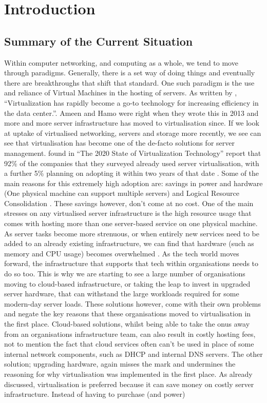 
\chapter{Introduction}
\section{Summary of the Current Situation}
\label{CurrentSituation}
Within computer networking, and computing as a whole, we tend to move through paradigms. Generally, there is a set way of doing things and eventually there are breakthroughs that shift that standard. One such paradigm is the use and reliance of Virtual Machines in the hosting of servers. As written by \citet{VirtualNetworkingInTheFuture}, ``Virtualization has rapidly become a go-to technology for increasing efficiency in the data center.''. Ameen and Hamo were right when they wrote this in 2013 and more and more server infrastructure has moved to virtualisation since. If we look at uptake of virtualised networking, servers and storage more recently, we see can see that virtualisation has become one of the de-facto solutions for server management. \citet{Spiceworks} found in ``The 2020 State of Virtualization Technology'' report that 92\% of the companies that they surveyed already used server virtualisation, with a further 5\%  planning on adopting it within two years of that date \citep{Spiceworks}. Some of the main reasons for this extremely high adoption are: savings in power and hardware (One physical machine can support multiple servers) and Logical Resource Consolidation \citep{LetsGetVirtual}. These savings however, don't come at no cost. One of the main stresses on any virtualised server infrastructure is the high resource usage that comes with hosting more than one server-based service on one physical machine. As server tasks become more strenuous, or when entirely new services need to be added to an already existing infrastructure, we can find that hardware (such as memory and CPU usage) becomes overwhelmed \citep{LetsGetVirtual}. As the tech world moves forward, the infrastructure that supports that tech within organisations needs to do so too. This is why we are starting to see a large number of organisations moving to cloud-based infrastructure, or taking the leap to invest in upgraded server hardware, that can withstand the large workloads required for some modern-day server loads. These solutions however, come with their own problems and negate the key reasons that these organisations moved to virtualisation in the first place. Cloud-based solutions, whilst being able to take the onus away from an organisations infrastructure team, can also result in costly hosting fees, not to mention the fact that cloud services often can't be used in place of some internal network components, such as DHCP and internal DNS servers. The other solution; upgrading hardware, again misses the mark and undermines the reasoning for why virtualisation was implemented in the first place. As already discussed, virtualisation is preferred because it can save money on costly server infrastructure. Instead of having to purchase (and power) 